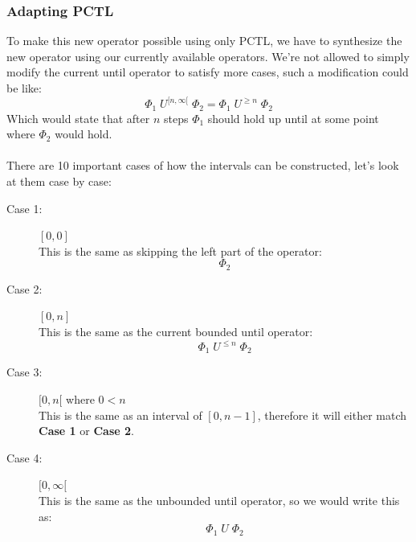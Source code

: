 \documentclass[12pt]{report}
\begin{document}
\subsubsection*{Adapting PCTL}
To make this new operator possible using only PCTL, we have to synthesize the new operator using our currently available operators. We're not allowed to simply modify the current until operator to satisfy more cases, such a modification could be like:
$$\Phi_1\;U^{[n, \infty[}\;\Phi_2 = \Phi_1\;U^{\geqslant n}\;\Phi_2$$
Which would state that after $n$ steps $\Phi_1$ should hold up until at some point where $\Phi_2$ would hold.\\
\\
There are 10 important cases of how the intervals can be constructed, let's look at them case by case:
\begin{description}
	\item[Case 1:] $[0, 0]$\\
	This is the same as skipping the left part of the operator:
	$$\Phi_2$$

	\item[Case 2:] $[0, n]$\\
	This is the same as the current bounded until operator:
	$$\Phi_1\;U^{\leqslant n}\;\Phi_2$$
	
	\item[Case 3:] $[0,n[$ where $0 < n$\\
	This is the same as an interval of $[0, n-1]$, therefore it will either match \textbf{Case 1} or \textbf{Case 2}.
	
	\item[Case 4:] $[0, \infty[$\\
	This is the same as the unbounded until operator, so we would write this as:
	$$\Phi_1\;U\;\Phi_2$$
	

\end{description}
\end{document}
